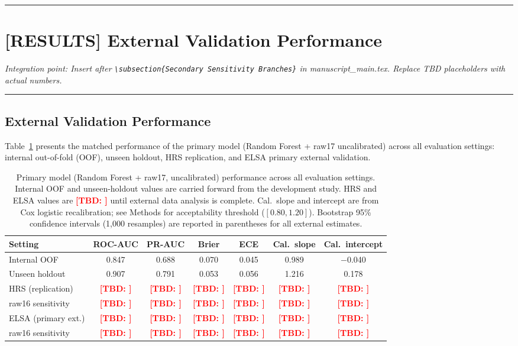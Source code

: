 \documentclass[11pt,a4paper]{article}
\newcommand{\TBD}[1]{\textcolor{red}{\textbf{[TBD: #1]}}}
\begin{document}
\vspace{8pt}
\hrule

\section*{[RESULTS] External Validation Performance}
\noindent\textit{Integration point: Insert after \texttt{\textbackslash subsection\{Secondary Sensitivity Branches\}} in manuscript\_main.tex. Replace TBD placeholders with actual numbers.}

\vspace{4pt}
\hrule
\vspace{8pt}

\subsection*{External Validation Performance}

Table~\ref{tab:external-metrics} presents the matched performance of the primary model (Random Forest + raw17 uncalibrated) across all evaluation settings: internal out-of-fold (OOF), unseen holdout, HRS replication, and ELSA primary external validation.

\begin{table}[h!]
\centering
\small
\caption{Primary model (Random Forest + raw17, uncalibrated) performance across all evaluation settings. Internal OOF and unseen-holdout values are carried forward from the development study. HRS and ELSA values are \TBD{} until external data analysis is complete. Cal.\ slope and intercept are from Cox logistic recalibration; see Methods for acceptability threshold ($[0.80, 1.20]$). Bootstrap 95\% confidence intervals (1{,}000 resamples) are reported in parentheses for all external estimates.}
\label{tab:external-metrics}
\begin{tabular}{lcccccc}
\toprule
Setting & ROC-AUC & PR-AUC & Brier & ECE & Cal.\ slope & Cal.\ intercept \\
\midrule
Internal OOF & 0.847 & 0.688 & 0.070 & 0.045 & 0.989 & $-$0.040 \\
Unseen holdout & 0.907 & 0.791 & 0.053 & 0.056 & 1.216 & 0.178 \\
\midrule
HRS (replication) & \TBD{} & \TBD{} & \TBD{} & \TBD{} & \TBD{} & \TBD{} \\
\quad raw16 sensitivity & \TBD{} & \TBD{} & \TBD{} & \TBD{} & \TBD{} & \TBD{} \\
ELSA (primary ext.) & \TBD{} & \TBD{} & \TBD{} & \TBD{} & \TBD{} & \TBD{} \\
\quad raw16 sensitivity & \TBD{} & \TBD{} & \TBD{} & \TBD{} & \TBD{} & \TBD{} \\
\bottomrule
\end{tabular}
\end{table}
\end{document}
